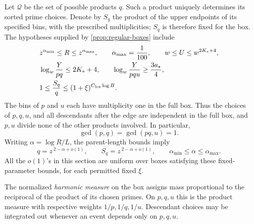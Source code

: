 Let \(\mathcal Q\) be the set of possible products \(q\).  Such a product
uniquely determines its sorted prime choices.  Denote by \(S_q\) the
product of the upper endpoints of its specified bins, with the
prescribed multiplicities; \(S_q\) is therefore fixed for the box.
The hypotheses supplied by \cref{prop:regular-boxes} include
\begin{align}
 &z^{\alpha_{\min}}\le R\le z^{\alpha_{\max}},
       \qquad \alpha_{\max}=\frac1{100},
       \qquad w\le U\le w^{2K_*+4},                                      \label{eq:inverse-box-ranges}\\
 &\log_w\frac{Y}{p q}\le2K_*+4,
       \qquad
       \log_w\frac{Y}{p q u}\ge\frac{3a_\star}{4},                       \label{eq:inverse-length-ranges}\\
 &1\le \frac{S_q}{q}\le
       (1+\xi)^{C_{\rm len}\log B}.                                     \label{eq:inverse-q-range}
\end{align}
The bins of \(p\) and \(u\) each have multiplicity one in the full box.
Thus the choices of \(p,q,u\), and all descendants after the edge are
independent in the full box, and \(p,u\) divide none of the other
products involved.  In particular,
\[
 \gcd(p,q)=\gcd(pq,u)=1 .
\]
Writing \(\alpha=\log R/L\), the parent-length bounds imply
\begin{equation}
 q=z^{\,2-\alpha+o(1)},\qquad
 S_q=z^{\,2-\alpha+o(1)},
 \qquad
 \alpha_{\min}\le\alpha\le\alpha_{\max}.
 \label{eq:inverse-q-size}
\end{equation}
All the \(o(1)\)'s in this section are uniform over boxes satisfying
these fixed-parameter bounds, for each permitted fixed \(\xi\).

The normalized \emph{harmonic measure} on the box assigns mass
proportional to the reciprocal of the product of its chosen primes.
On \(p,q,u\) this is the product measure with respective weights
\(1/p,1/q,1/u\).  Descendant choices may be integrated out whenever an
event depends only on \(p,q,u\).

